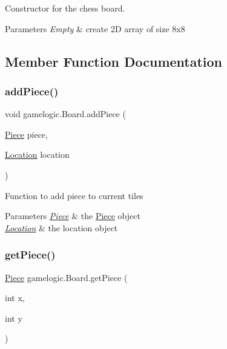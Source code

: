 Constructor for the chess board. 
\begin{DoxyParams}{Parameters}
{\em Empty} & create 2D array of size 8x8 \\
\hline
\end{DoxyParams}


\subsection{Member Function Documentation}
\mbox{\label{classgamelogic_1_1_board_acc3de86741f4e9cec9b31c544937333d}} 
\subsubsection{\texorpdfstring{add\+Piece()}{addPiece()}}
{\footnotesize\ttfamily void gamelogic.\+Board.\+add\+Piece (\begin{DoxyParamCaption}\item[{\mbox{\hyperlink{classgamelogic_1_1_piece}{Piece}}}]{piece,  }\item[{\mbox{\hyperlink{classgamelogic_1_1_location}{Location}}}]{location }\end{DoxyParamCaption})}

Function to add piece to current tiles 
\begin{DoxyParams}{Parameters}
{\em \mbox{\hyperlink{classgamelogic_1_1_piece}{Piece}}} & the \mbox{\hyperlink{classgamelogic_1_1_piece}{Piece}} object \\
\hline
{\em \mbox{\hyperlink{classgamelogic_1_1_location}{Location}}} & the location object \\
\hline
\end{DoxyParams}
\mbox{\label{classgamelogic_1_1_board_ab53a8d50f60e7127e633fd4843e8c20c}} 
\subsubsection{\texorpdfstring{get\+Piece()}{getPiece()}}
{\footnotesize\ttfamily \mbox{\hyperlink{classgamelogic_1_1_piece}{Piece}} gamelogic.\+Board.\+get\+Piece (\begin{DoxyParamCaption}\item[{int}]{x,  }\item[{int}]{y }\end{DoxyParamCaption})}

